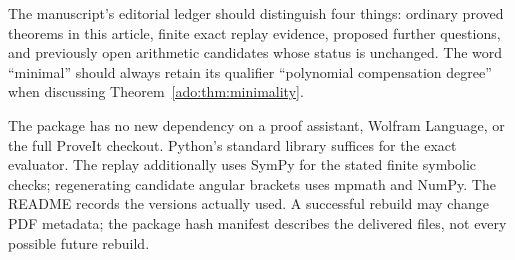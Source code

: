 The manuscript's editorial ledger should distinguish four things:
ordinary proved theorems in this article, finite exact replay evidence,
proposed further questions, and previously open arithmetic candidates
whose status is unchanged. The word ``minimal'' should always retain
its qualifier ``polynomial compensation degree'' when discussing
Theorem~\ref{ado:thm:minimality}.

The package has no new dependency on a proof assistant, Wolfram Language,
or the full ProveIt checkout. Python's standard library suffices for the
exact evaluator. The replay additionally uses SymPy for the stated finite
symbolic checks; regenerating candidate angular brackets uses mpmath and
NumPy. The README records the versions actually used. A successful
rebuild may change PDF metadata; the package hash manifest describes the
delivered files, not every possible future rebuild.
